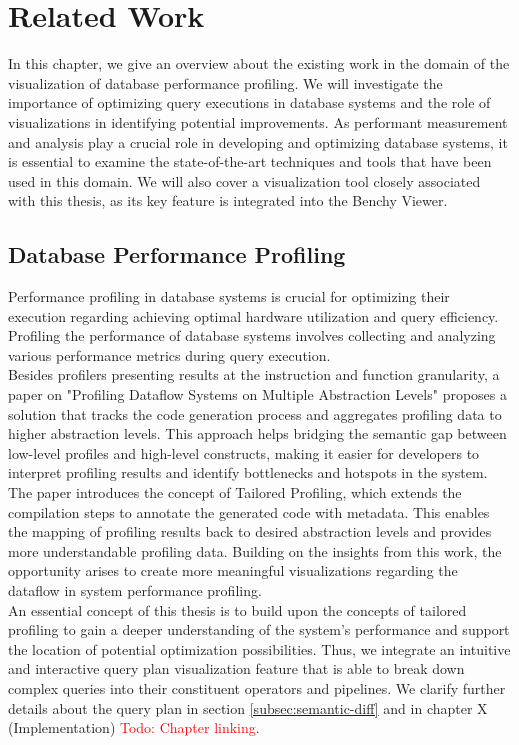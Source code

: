 
\chapter{Related Work}\label{chapter:relatedWork}
In this chapter, we give an overview about the existing work in the domain of the visualization of database performance profiling.
We will investigate the importance of optimizing query executions in database systems and the role of visualizations in identifying potential improvements.
As performant measurement and analysis play a crucial role in developing and optimizing database systems, 
it is essential to examine the state-of-the-art techniques and tools that have been used in this domain.
We will also cover a visualization tool closely associated with this thesis, as its key feature is integrated into the Benchy Viewer.



\section{Database Performance Profiling }

Performance profiling in database systems is crucial for optimizing their execution regarding achieving optimal hardware utilization and query efficiency.
Profiling the performance of database systems involves collecting and analyzing various performance metrics during query execution.
\\Besides profilers presenting results at the instruction and function granularity, a paper on "Profiling Dataflow Systems on Multiple Abstraction Levels" \cite{profiling-dataflow} proposes a solution that tracks the code generation process and aggregates profiling data to higher abstraction levels. This approach helps bridging the semantic gap between low-level profiles and high-level constructs, making it easier for developers to interpret profiling results and identify bottlenecks and hotspots in the system. The paper introduces the concept of Tailored Profiling, which extends the compilation steps to annotate the generated code with metadata. This enables the mapping of profiling results back to desired abstraction levels and provides more understandable profiling data.
Building on the insights from this work, the opportunity arises to create more meaningful visualizations regarding the dataflow in system performance profiling.
\\ An essential concept of this thesis is to build upon the concepts of tailored profiling to gain a deeper understanding of the system's performance and support the location of potential optimization possibilities. Thus, we integrate an intuitive and interactive query plan visualization feature that is able to break down complex queries into their constituent operators and pipelines. We clarify further details about the query plan in section \ref{subsec:semantic-diff} and in chapter X (Implementation) \textcolor{red}{Todo: Chapter linking}.

